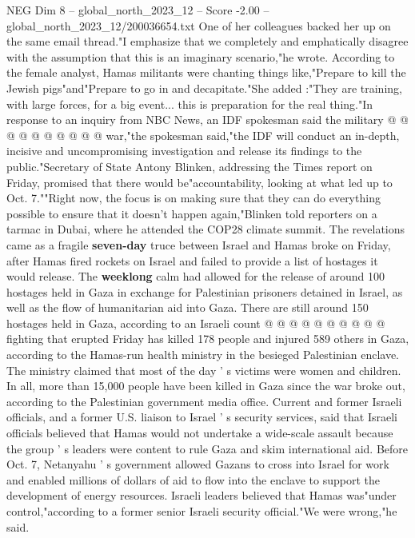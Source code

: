 \begin{textsample}{NEG Dim 8 – global\_north\_2023\_12 – Score -2.00 – global\_north\_2023\_12/200036654.txt}
One of her colleagues backed her up on the same email thread."I emphasize that we completely and emphatically disagree with the assumption that this is an imaginary scenario,"he wrote.
According to the female analyst, Hamas militants were chanting things like,"Prepare to kill the Jewish pigs"and"Prepare to go in and decapitate."She added :"They are training, with large forces, for a big event... this is preparation for the real thing."In response to an inquiry from NBC News, an IDF spokesman said the military @ @ @ @ @ @ @ @ @ @ war,"the spokesman said,"the IDF will conduct an in-depth, incisive and uncompromising investigation and release its findings to the public."Secretary of State Antony Blinken, addressing the Times report on Friday, promised that there would be"accountability, looking at what led up to Oct. 7.""Right now, the focus is on making sure that they can do everything possible to ensure that it doesn't happen again,"Blinken told reporters on a tarmac in Dubai, where he attended the COP28 climate summit.
The revelations came as a fragile \textbf{seven-day} truce between Israel and Hamas broke on Friday, after Hamas fired rockets on Israel and failed to provide a list of hostages it would release.
The \textbf{weeklong} calm had allowed for the release of around 100 hostages held in Gaza in exchange for Palestinian prisoners detained in Israel, as well as the flow of humanitarian aid into Gaza.
There are still around 150 hostages held in Gaza, according to an Israeli count @ @ @ @ @ @ @ @ @ @ fighting that erupted Friday has killed 178 people and injured 589 others in Gaza, according to the Hamas-run health ministry in the besieged Palestinian enclave.
The ministry claimed that most of the day ' s victims were women and children.
In all, more than 15,000 people have been killed in Gaza since the war broke out, according to the Palestinian government media office.
Current and former Israeli officials, and a former U.S. liaison to Israel ' s security services, said that Israeli officials believed that Hamas would not undertake a wide-scale assault because the group ' s leaders were content to rule Gaza and skim international aid.
Before Oct. 7, Netanyahu ' s government allowed Gazans to cross into Israel for work and enabled millions of dollars of aid to flow into the enclave to support the development of energy resources.
Israeli leaders believed that Hamas was"under control,"according to a former senior Israeli security official."We were wrong,"he said.

\end{textsample}
